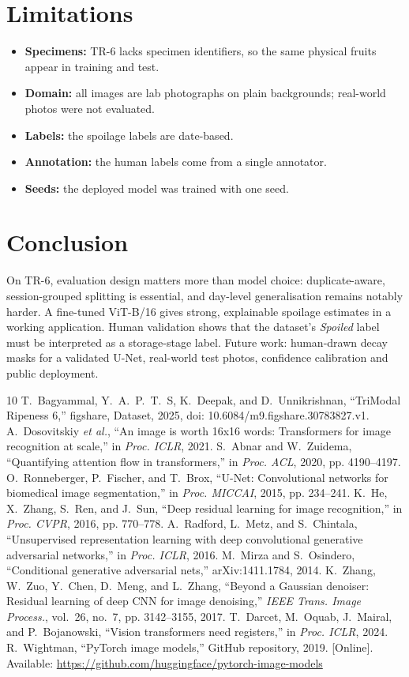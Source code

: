 \documentclass[conference]{IEEEtran}
\begin{document}
\section{Limitations}
\begin{itemize}
\item \textbf{Specimens:} TR-6 lacks specimen identifiers, so the same physical fruits appear in training and test.
\item \textbf{Domain:} all images are lab photographs on plain backgrounds; real-world photos were not evaluated.
\item \textbf{Labels:} the spoilage labels are date-based.
\item \textbf{Annotation:} the human labels come from a single annotator.
\item \textbf{Seeds:} the deployed model was trained with one seed.
\end{itemize}

\section{Conclusion}
On TR-6, evaluation design matters more than model choice: duplicate-aware, session-grouped splitting is essential, and day-level generalisation remains notably harder.
A fine-tuned ViT-B/16 gives strong, explainable spoilage estimates in a working application.
Human validation shows that the dataset's \emph{Spoiled} label must be interpreted as a storage-stage label.
Future work: human-drawn decay masks for a validated U-Net, real-world test photos, confidence calibration and public deployment.

\begin{thebibliography}{10}
 T.~Bagyammal, Y.~A.~P.~T.~S, K.~Deepak, and D.~Unnikrishnan, ``TriModal Ripeness 6,'' figshare, Dataset, 2025, doi: 10.6084/m9.figshare.30783827.v1.
 A.~Dosovitskiy \emph{et al.}, ``An image is worth 16x16 words: Transformers for image recognition at scale,'' in \emph{Proc. ICLR}, 2021.
 S.~Abnar and W.~Zuidema, ``Quantifying attention flow in transformers,'' in \emph{Proc. ACL}, 2020, pp. 4190--4197.
 O.~Ronneberger, P.~Fischer, and T.~Brox, ``U-Net: Convolutional networks for biomedical image segmentation,'' in \emph{Proc. MICCAI}, 2015, pp. 234--241.
 K.~He, X.~Zhang, S.~Ren, and J.~Sun, ``Deep residual learning for image recognition,'' in \emph{Proc. CVPR}, 2016, pp. 770--778.
 A.~Radford, L.~Metz, and S.~Chintala, ``Unsupervised representation learning with deep convolutional generative adversarial networks,'' in \emph{Proc. ICLR}, 2016.
 M.~Mirza and S.~Osindero, ``Conditional generative adversarial nets,'' arXiv:1411.1784, 2014.
 K.~Zhang, W.~Zuo, Y.~Chen, D.~Meng, and L.~Zhang, ``Beyond a Gaussian denoiser: Residual learning of deep CNN for image denoising,'' \emph{IEEE Trans. Image Process.}, vol.~26, no.~7, pp. 3142--3155, 2017.
 T.~Darcet, M.~Oquab, J.~Mairal, and P.~Bojanowski, ``Vision transformers need registers,'' in \emph{Proc. ICLR}, 2024.
 R.~Wightman, ``PyTorch image models,'' GitHub repository, 2019. [Online]. Available: \url{https://github.com/huggingface/pytorch-image-models}
\end{thebibliography}
\end{document}
